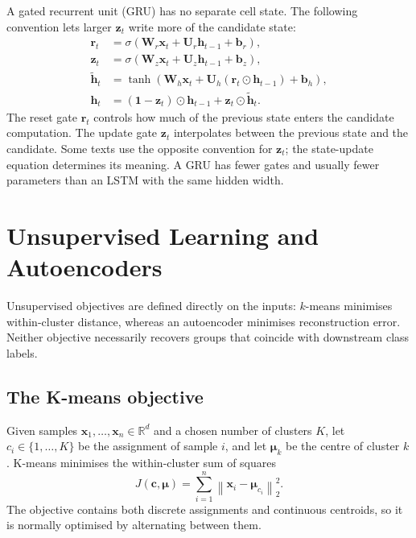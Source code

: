 A gated recurrent unit (GRU) has no separate cell state. The following convention lets larger \(\mathbf{z}_t\) write more of the candidate state:
\begin{align}
    \mathbf{r}_t
    &=\sigma\!\left(
      \mathbf{W}_r\mathbf{x}_t
      +\mathbf{U}_r\mathbf{h}_{t-1}
      +\mathbf{b}_r
    \right),\\
    \mathbf{z}_t
    &=\sigma\!\left(
      \mathbf{W}_z\mathbf{x}_t
      +\mathbf{U}_z\mathbf{h}_{t-1}
      +\mathbf{b}_z
    \right),\\
    \widetilde{\mathbf{h}}_t
    &=\tanh\!\left(
      \mathbf{W}_h\mathbf{x}_t
      +\mathbf{U}_h
       (\mathbf{r}_t\odot\mathbf{h}_{t-1})
      +\mathbf{b}_h
    \right),\\
    \mathbf{h}_t
    &=(\mathbf{1}-\mathbf{z}_t)
      \odot\mathbf{h}_{t-1}
      +\mathbf{z}_t\odot\widetilde{\mathbf{h}}_t.
    \label{eq:gru-update}
\end{align}
The reset gate \(\mathbf{r}_t\) controls how much of the previous state enters the candidate computation. The update gate \(\mathbf{z}_t\) interpolates between the previous state and the candidate. Some texts use the opposite convention for \(\mathbf{z}_t\); the state-update equation determines its meaning. A GRU has fewer gates and usually fewer parameters than an LSTM with the same hidden width.


\section{Unsupervised Learning and Autoencoders}
\label{sec:unsupervised}

Unsupervised objectives are defined directly on the inputs: $k$-means minimises within-cluster distance, whereas an autoencoder minimises reconstruction error. Neither objective necessarily recovers groups that coincide with downstream class labels.

\ArchitectureFigure

\subsection{The K-means objective}

Given samples \(\mathbf{x}_1,\ldots,\mathbf{x}_n\in\mathbb{R}^{d}\) and a chosen number of clusters \(K\), let \(c_i\in\{1,\ldots,K\}\) be the assignment of sample \(i\), and let \(\boldsymbol{\mu}_k\) be the centre of cluster \(k\). K-means minimises the within-cluster sum of squares
\begin{equation}
    J(\mathbf{c},\boldsymbol{\mu})
    =\sum_{i=1}^{n}
      \left\lVert
      \mathbf{x}_i-\boldsymbol{\mu}_{c_i}
      \right\rVert_2^2.
    \label{eq:kmeans-objective}
\end{equation}
The objective contains both discrete assignments and continuous centroids, so it is normally optimised by alternating between them.


